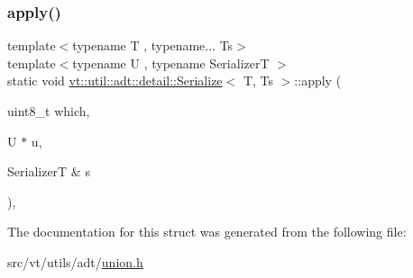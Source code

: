 \subsubsection{\texorpdfstring{apply()}{apply()}}
{\footnotesize\ttfamily template$<$typename T , typename... Ts$>$ \\
template$<$typename U , typename SerializerT $>$ \\
static void \hyperlink{structvt_1_1util_1_1adt_1_1detail_1_1_serialize}{vt\+::util\+::adt\+::detail\+::\+Serialize}$<$ T, Ts $>$\+::apply (\begin{DoxyParamCaption}\item[{uint8\+\_\+t}]{which,  }\item[{U $\ast$}]{u,  }\item[{SerializerT \&}]{s }\end{DoxyParamCaption})\hspace{0.3cm}{\ttfamily [inline]}, {\ttfamily [static]}}



The documentation for this struct was generated from the following file\+:\begin{DoxyCompactItemize}
\item 
src/vt/utils/adt/\hyperlink{union_8h}{union.\+h}\end{DoxyCompactItemize}
